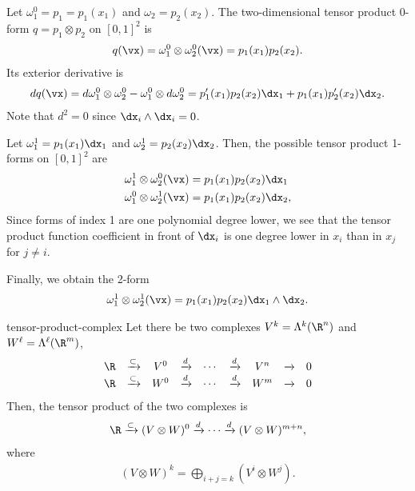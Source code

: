\begin{example}
  Let $\omega_1^0 = p_1 = p_1(x_1)$ and $\omega_2 = p_2(x_2)$.
  The two-dimensional tensor product $0$-form $q=p_1\otimes p_2$ on $[0,1]^2$ is
  \begin{gather}
    q(\vx) = \omega_1^0\otimes \omega_2^0(\vx) = p_1(x_1)p_2(x_2).
  \end{gather}
  Its exterior derivative is
  \begin{gather}
    d q(\vx) = d\omega_1^0 \otimes \omega_2^0 - \omega_1^0 \otimes d\omega_2^0
    = p_1'(x_1) p_2(x_2) \dx_1 + p_1(x_1) p_2'(x_2) \dx_2.
  \end{gather}
  Note that $d^2 = 0$ since $\dx_i\wedge \dx_i=0$.
  
  Let $\omega_1^1 = p_1(x_1)\dx_1$ and $\omega_2^1 = p_2(x_2)\dx_2$. Then, the
  possible tensor product 1-forms on $[0,1]^2$ are
  \begin{align}
    \omega_1^1 \otimes \omega_2^0 (\vx) &= p_1(x_1)p_2(x_2) \dx_1 \\
    \omega_1^0 \otimes \omega_2^1 (\vx) &= p_1(x_1)p_2(x_2) \dx_2,
  \end{align}
  Since forms of index 1 are one polynomial degree lower, we see that
  the tensor product function coefficient in front of $\dx_i$ is one
  degree lower in $x_i$ than in $x_j$ for $j\neq i$.

  Finally, we obtain the 2-form
  \begin{gather}
    \omega_1^1 \otimes \omega_2^1 (\vx) = p_1(x_1)p_2(x_2) \dx_1\wedge\dx_2.    
  \end{gather}
\end{example}

\begin{Definition}{tensor-product-complex}
  Let there be two complexes $V^k = \Lambda^k(\R^n)$ and $W^\ell = \Lambda^\ell(\R^m)$,
  \begin{gather}
    \begin{matrix}
      \R&\xrightarrow{\subset}&V^0&\xrightarrow{d}&\cdots&
      \xrightarrow{d}&V^n&\xrightarrow{}& 0\\
      \R&\xrightarrow{\subset}&W^0&\xrightarrow{d}&\cdots&
      \xrightarrow{d}&W^m&\xrightarrow{}& 0
    \end{matrix}
  \end{gather}
  Then, the tensor product of the two complexes is
  \begin{gather}
    \R\xrightarrow{\subset}(V\otimes W)^0
    \xrightarrow{d}\cdots\xrightarrow{d}(V\otimes W)^{m+n},
  \end{gather}
  where
  \begin{gather}
    (V\otimes W)^k = \bigoplus_{i+j=k} (V^i\otimes W^j).
  \end{gather}
\end{Definition}

